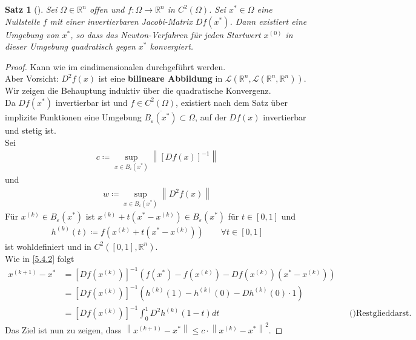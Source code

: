 \documentclass[ngerman,fontsize=11pt, paper=a4, parskip=half, titlepage=true, toc=bib]{scrbook}
\theoremstyle{definition}
\theoremstyle{plain}
\newtheorem{Satz}[Def]{Satz}		%
\newcommand{\R}{\mathds{R}}
\newcommand{\Ren}{\mathds{R}^{n}}
\newcommand{\nn}[1]{\left\| #1 \right\|}
\newcommand{\subsectione}[1]{\addtocounter{Def}{1}\subsection{#1}}
\newenvironment{Satze}[1][]{ %
  \begin{Satz}[#1]
  }
  {
  \end{Satz}
  \addtocounter{subsection}{1}
}
\begin{document}
\begin{Satze}
  Sei $\Omega\in\R^n$ offen und $f:\Omega\rightarrow\Ren$ in $C^2(\Omega)$.
  Sei $x^{*}\in\Omega $ eine Nullstelle $f$ mit einer invertierbaren Jacobi-Matrix $Df(x^{*})$.
  Dann existiert eine Umgebung von $x^{*}$, so dass das Newton-Verfahren 
  für jeden Startwert $x^{(0)}$ in dieser Umgebung
  quadratisch gegen $x^{*}$ konvergiert.
\end{Satze}

\begin{proof}
  Kann wie im eindimensionalen durchgeführt werden.\\
  Aber Vorsicht: $D^2f(x)$ ist eine \textbf{bilineare Abbildung} in 
  $\mathcal{L}(\Ren, \mathcal{L}(\Ren, \Ren))$. \\
  
  Wir zeigen die Behauptung induktiv über die quadratische Konvergenz.\\
  Da $Df(x^{*})$ invertierbar ist und $f\in C^2(\Omega) $,
  existiert nach dem Satz über implizite Funktionen
  eine Umgebung $\overline{B_\varepsilon(x^{*})}\subset \Omega$,
  auf der $Df(x)$ invertierbar und stetig ist.\\
  Sei 
  \begin{gather*}
    c\coloneqq \sup_{x\in B_\varepsilon(x^{*})} \nn{[Df(x)]^{-1}}
  \end{gather*}
  und 
  \begin{gather*}
    w\coloneqq \sup_{x\in B_\varepsilon(x^{*})}\nn{D^2f(x)}
  \end{gather*}
  Für $x^{(k)}\in B_\varepsilon(x^{*}) $ ist $x^{(k)}+t(x^{*}-x^{(k)})\in B_\varepsilon(x^{*})$
  für $t\in [0,1]$ und 
  \begin{gather*}
    h^{(k)}(t) \coloneqq f(x^{(k)}+ t(x^{*}-x^{(k)}))\qquad \forall t\in [0,1]
  \end{gather*}
  ist wohldefiniert und in $C^2([0,1], \Ren)$.\\
  Wie in \ref{5.4.2} folgt 
  \begin{align*}
    x^{(k+1)}-x^{*} &= [Df(x^{(k)})]^{-1}\left(f(x^{*})-f(x^{(k)})-Df(x^{(k)})(x^{*}-x^{(k)})\right)\\
                    &= [Df(x^{(k)})]^{-1}\left( h^{(k)}(1)-h^{(k)}(0)-Dh^{(k)}(0)\cdot 1\right)\\
                    &= [Df(x^{(k)})]^{-1} \int_{0}^{1}D^2h^{(k)}(1-t)dt &&\text{()Restglieddarst. der Taylorentw.)}
  \end{align*}
  Das Ziel ist nun zu zeigen, dass $\nn{x^{(k+1)}-x^{*}} \leq c\cdot \nn{x^{(k)}-x^{*}}^2$.

\end{proof}
\end{document}
